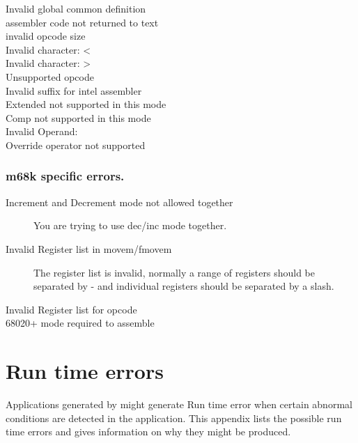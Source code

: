 \begin{description}
\item [ Invalid global common definition ]
\item [ assembler code not returned to text ]
\item [ invalid opcode size ]
\item [ Invalid character: < ]
\item [ Invalid character: > ]
\item [ Unsupported opcode ]
\item [ Invalid suffix for intel assembler ]
\item [ Extended not supported in this mode ]
\item [ Comp not supported in this mode ]
\item [ Invalid Operand: ]
\item [ Override operator not supported ]
\end{description}

\subsection{m68k specific errors.}
\begin{description}
\item [Increment and Decrement mode not allowed together]
You are trying to use dec/inc mode together.

\item [Invalid Register list in movem/fmovem]
The register list is invalid, normally a range of registers should
be separated by - and individual registers should be separated by
a slash.
\item [Invalid Register list for opcode]
\item [68020+ mode required to assemble]
\end{description}

\chapter{Run time errors}

Applications generated  by \fpc might generate
Run time error when certain abnormal conditions are
detected in the application. This appendix lists the possible run time
errors and gives information on why they might be produced.

